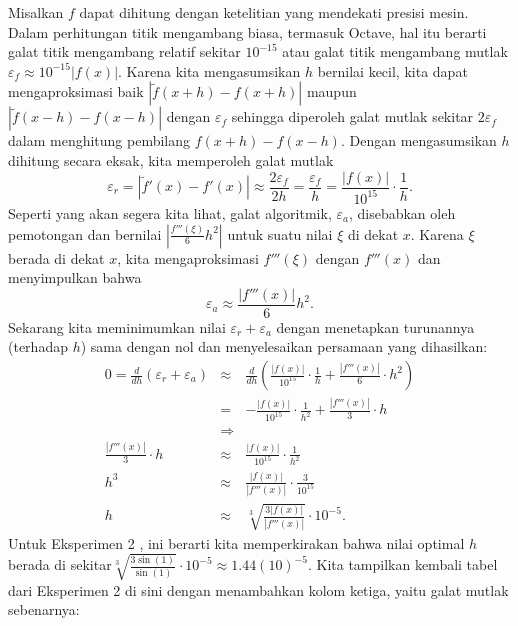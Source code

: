 Misalkan $f$ dapat dihitung dengan ketelitian yang mendekati presisi
mesin. Dalam perhitungan titik mengambang biasa, termasuk Octave,
hal itu berarti galat titik mengambang relatif sekitar $10^{-15}$
atau galat titik mengambang mutlak $\varepsilon_{f}\approx10^{-15}|f(x)|$.
Karena kita mengasumsikan $h$ bernilai kecil, kita dapat mengaproksimasi
baik $|\tilde{f}(x+h)-f(x+h)|$ maupun $|\tilde{f}(x-h)-f(x-h)|$
dengan $\varepsilon_{f}$ sehingga diperoleh galat mutlak sekitar
$2\varepsilon_{f}$ dalam menghitung pembilang $f(x+h)-f(x-h)$. Dengan
mengasumsikan $h$ dihitung secara eksak, kita memperoleh galat mutlak
\begin{equation}
\varepsilon_{r}=|\tilde{f}'(x)-f'(x)|\approx\frac{2\varepsilon_{f}}{2h}=\frac{\varepsilon_{f}}{h}=\frac{|f(x)|}{10^{15}}\cdot\frac{1}{h}.\label{eq:floatingPointError}
\end{equation}
Seperti yang akan segera kita lihat, galat algoritmik, $\varepsilon_{a}$,
disebabkan oleh pemotongan dan bernilai $\left|\frac{f'''(\xi)}{6}h^{2}\right|$
untuk suatu nilai $\xi$ di dekat $x$. Karena $\xi$ berada di dekat
$x$, kita mengaproksimasi $f'''(\xi)$ dengan $f'''(x)$ dan menyimpulkan
bahwa 
\begin{equation}
\varepsilon_{a}\approx\frac{|f'''(x)|}{6}h^{2}.\label{eq:algorithmicError}
\end{equation}
Sekarang kita meminimumkan nilai $\varepsilon_{r}+\varepsilon_{a}$
dengan menetapkan turunannya (terhadap $h$) sama dengan nol dan menyelesaikan
persamaan yang dihasilkan:
\begin{eqnarray*}
0=\frac{d}{dh}(\varepsilon_{r}+\varepsilon_{a}) & \approx & \frac{d}{dh}\left(\frac{|f(x)|}{10^{15}}\cdot\frac{1}{h}+\frac{|f'''(x)|}{6}\cdot h^{2}\right)\\
 & = & -\frac{|f(x)|}{10^{15}}\cdot\frac{1}{h^{2}}+\frac{|f'''(x)|}{3}\cdot h\\
 & \Rightarrow\\
\frac{|f'''(x)|}{3}\cdot h & \approx & \frac{|f(x)|}{10^{15}}\cdot\frac{1}{h^{2}}\\
h^{3} & \approx & \frac{|f(x)|}{|f'''(x)|}\cdot\frac{3}{10^{15}}\\
h & \approx & \sqrt[3]{\frac{3|f(x)|}{|f'''(x)|}}\cdot10^{-5}.
\end{eqnarray*}
Untuk Eksperimen 2 , ini berarti
kita memperkirakan bahwa nilai optimal $h$ berada di sekitar$\sqrt[3]{\frac{3\sin(1)}{\sin(1)}}\cdot10^{-5}\approx1.44(10)^{-5}$.
Kita tampilkan kembali tabel dari Eksperimen 2 di sini dengan menambahkan
kolom ketiga, yaitu galat mutlak sebenarnya:

